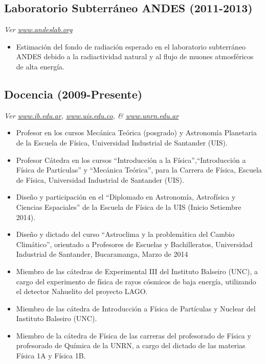 \subsection*{Laboratorio Subterráneo ANDES (2011-2013)}
{\small{\textit{Ver \href{http://www.andeslab.org}{www.andeslab.org}}}}
\begin{itemize}
\item Estimación del fondo de radiación esperado en el laboratorio subterráneo ANDES debido a la radiactividad natural y al flujo de muones atmosféricos de alta energía.
\end{itemize}

\subsection*{Docencia (2009-Presente)}
{\small{\textit{Ver \href{http://www.ib.edu.ar}{www.ib.edu.ar}, \href{http://www.uis.edu.co}{www.uis.edu.co}, \& \href{http://www.unrn.edu.ar}{www.unrn.edu.ar}}}}
\begin{itemize}
\item Profesor en los cursos Mecánica Teórica (posgrado) y Astronomía Planetaria de la Escuela de Física, Universidad Industrial de Santander (UIS).
\item Profesor Cátedra en los cursos ``Introducción a la Física'',``Introducción a Física de Partículas'' y ``Mecánica Teórica'', para la Carrera de Física, Escuela de Física, Universidad Industrial de Santander (UIS).
\item Diseño y participación en el ``Diplomado en Astronomía, Astrofísica y Ciencias Espaciales'' de la Escuela de Física de la UIS (Inicio Setiembre 2014).
\item Diseño y dictado del curso ``Astroclima y la problemática del Cambio Climático'', orientado a Profesores de Escuelas y Bachilleratos, Universidad Industrial de Santander, Bucaramanga, Marzo de 2014
\item Miembro de las cátedras de Experimental III del Instituto Balseiro (UNC), a cargo del experimento de física de rayos cósmicos de baja energía, utilizando el detector Nahuelito del proyecto LAGO.
\item Miembro de las cátedra de Introducción a Física de Partículas y Nuclear del Instituto Balseiro (UNC).
\item Miembro de la cátedra de Física de las carreras del profesorado de Física y profesorado de Química de la UNRN, a cargo del dictado de las materias Física 1A y Física 1B.
\end{itemize}
\fi

